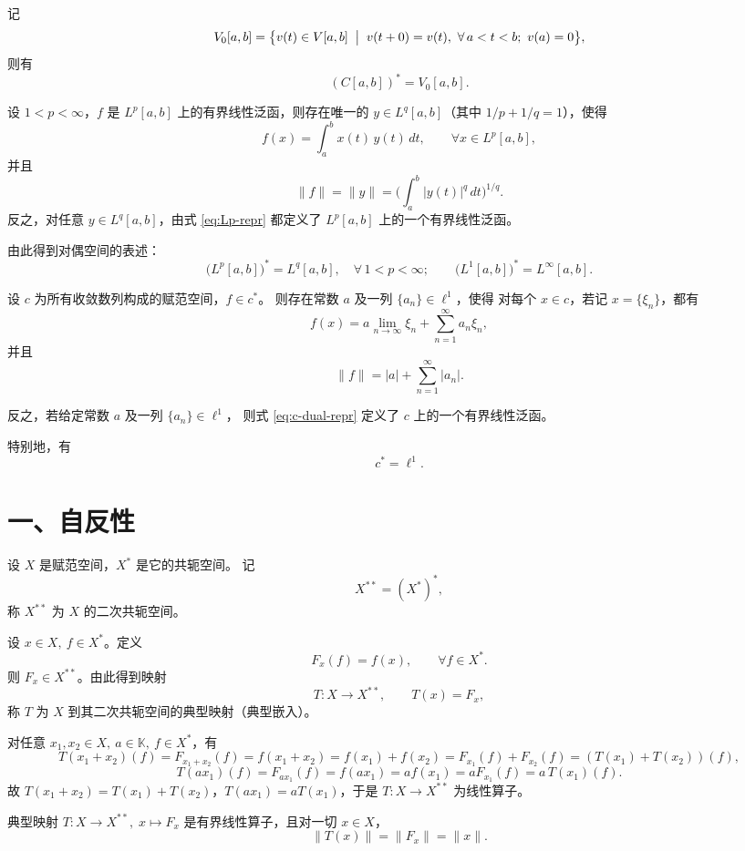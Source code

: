 记
\[
V_0[a,b]
=\bigl\{
v(t)\in V[a,b]\;\bigm|\;
v(t+0)=v(t),\ \forall\,a<t<b;\ v(a)=0
\bigr\},
\]
则有
\[
(C[a,b])^* = V_0[a,b].
\]
\begin{theorem}\label{thm:Lp-dual}
设 $1<p<\infty$，$f$ 是 $L^p[a,b]$ 上的有界线性泛函，则存在唯一的
$y\in L^q[a,b]$（其中 $1/p+1/q=1$），使得
\begin{equation}\label{eq:Lp-repr}
    f(x)=\int_a^b x(t)\,y(t)\,dt,\qquad \forall x\in L^p[a,b],
\end{equation}
并且
\[
    \|f\|=\|y\|
    =\biggl(\int_a^b |y(t)|^q\,dt\biggr)^{1/q}.
\]
反之，对任意 $y\in L^q[a,b]$，由式 \eqref{eq:Lp-repr} 都定义了
$L^p[a,b]$ 上的一个有界线性泛函。
\end{theorem}

由此得到对偶空间的表述：
\[
\bigl(L^p[a,b]\bigr)^* = L^q[a,b],\quad \forall\,1<p<\infty;
\qquad
\bigl(L^1[a,b]\bigr)^* = L^\infty[a,b].
\]
\begin{theorem}\label{thm:c-dual}
设 $c$ 为所有收敛数列构成的赋范空间，$f\in c^*$。
则存在常数 $a$ 及一列 $\{a_n\}\in \ell^1$，使得
对每个 $x\in c$，若记 $x=\{\xi_n\}$，都有
\begin{equation}\label{eq:c-dual-repr}
    f(x)
    = a\lim_{n\to\infty}\xi_n
      + \sum_{n=1}^{\infty} a_n \xi_n,
\end{equation}
并且
\[
    \|f\| = |a| + \sum_{n=1}^{\infty}|a_n|.
\]

反之，若给定常数 $a$ 及一列 $\{a_n\}\in \ell^1$，
则式 \eqref{eq:c-dual-repr} 定义了 $c$ 上的一个有界线性泛函。

特别地，有
\[
    c^* = \ell^1.
\]
\end{theorem}
\section*{一、自反性}

\begin{definition}[二次共轭空间]
设 $X$ 是赋范空间，$X^*$ 是它的共轭空间。
记
\[
X^{**}=(X^*)^*,
\]
称 $X^{**}$ 为 $X$ 的二次共轭空间。
\end{definition}

\begin{definition}
设 $x\in X,\ f\in X^*$。定义
\[
F_x(f)=f(x),\qquad \forall f\in X^* .
\]
则 $F_x\in X^{**}$。由此得到映射
\[
T:X\to X^{**},\qquad T(x)=F_x,
\]
称 $T$ 为 $X$ 到其二次共轭空间的典型映射（典型嵌入）。
\end{definition}

\begin{proposition}[典型映射是线性算子]
对任意 $x_1,x_2\in X,\ a\in\mathbb K,\ f\in X^*$，有
\[
T(x_1+x_2)(f)=F_{x_1+x_2}(f)
= f(x_1+x_2)=f(x_1)+f(x_2)
=F_{x_1}(f)+F_{x_2}(f)
= (T(x_1)+T(x_2))(f),
\]
\[
T(ax_1)(f)=F_{ax_1}(f)=f(ax_1)=a f(x_1)=aF_{x_1}(f)=a\,T(x_1)(f).
\]
故 $T(x_1+x_2)=T(x_1)+T(x_2)$，$T(ax_1)=aT(x_1)$，于是 $T:X\to X^{**}$ 为线性算子。
\end{proposition}
\begin{proposition}
典型映射 $T:X\to X^{**},\;x\mapsto F_x$ 是有界线性算子，且对一切 $x\in X$，
\[
\|T(x)\|=\|F_x\|=\|x\|.
\tag{$*$}
\]
\end{proposition}

